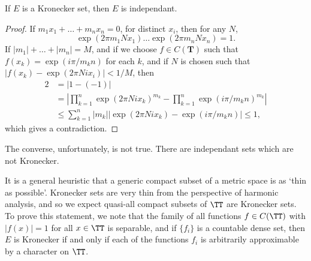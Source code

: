 \begin{lemma}
	If $E$ is a Kronecker set, then $E$ is independant.
\end{lemma}
\begin{proof}
	If $m_1 x_1 + \dots + m_n x_n = 0$, for distinct $x_i$, then for any $N$,
	\[ \exp(2\pi m_1 N x_1) \dots \exp(2\pi m_n N x_n) = 1. \]
	If $|m_1| + \dots + |m_n| = M$, and if we choose $f \in C(\mathbf{T})$ such that $f(x_k) = \exp(i \pi / m_k n)$ for each $k$, and if $N$ is chosen such that $|f(x_k) - \exp(2 \pi N i x_i)| < 1/M$, then
	\begin{align*}
		2 &= |1 - (-1)|\\
		&= \left| \prod_{k = 1}^n \exp(2 \pi N i x_k)^{m_k} - \prod_{k = 1}^n \exp(i \pi / m_k n)^{m_k} \right|\\
		&\leq \sum_{k = 1}^n |m_k| |\exp(2 \pi N i x_k) - \exp(i \pi / m_k n)| \leq 1,
	\end{align*}
	which gives a contradiction.
\end{proof}

\begin{remark}
	The converse, unfortunately, is not true. There are independant sets which are not Kronecker.
\end{remark}

It is a general heuristic that a generic compact subset of a metric space is as `thin as possible'. Kronecker sets are very thin from the perspective of harmonic analysis, and so we expect quasi-all compact subsets of $\TT$ are Kronecker sets. To prove this statement, we note that the family of all functions $f \in C(\TT)$ with $|f(x)| = 1$ for all $x \in \TT$ is separable, and if $\{ f_i \}$ is a countable dense set, then $E$ is Kronecker if and only if each of the functions $f_i$ is arbitrarily approximable by a character on $\TT$.

